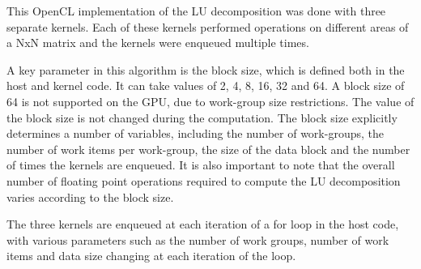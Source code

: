\par{This OpenCL implementation of the LU decomposition was done with three separate kernels. 
    Each of these kernels performed operations on different areas of a NxN matrix and the kernels were enqueued multiple times.}

\par{A key parameter in this algorithm is the block size, which is defined both in the host and kernel code. 
    It can take values of 2, 4, 8, 16, 32 and 64. A block size of 64 is not supported on the GPU, due to 
    work-group size restrictions. The value of the block size is not changed during the computation. 
    The block size explicitly determines a number of variables, including the number of work-groups, 
    the number of work items per work-group, the size of the data block and the number of times the kernels are enqueued. 
    It is also important to note that the overall number of floating point operations required to compute the LU decomposition 
    varies according to the block size.}

\par{The three kernels are enqueued at each iteration of a for loop in the host code, with various parameters 
    such as the number of work groups, number of work items and data size changing at each iteration of the loop.}
